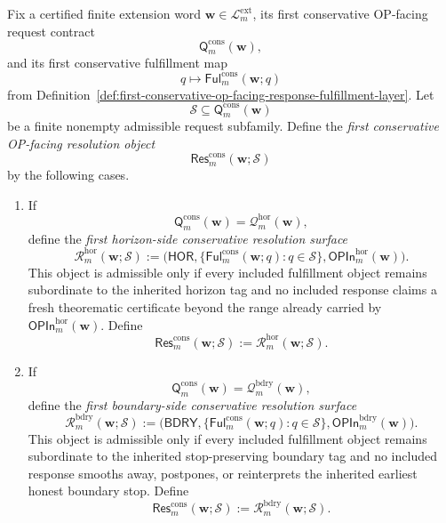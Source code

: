 \begin{definition}
\label{def:first-conservative-op-facing-response-aggregation-resolution-layer}
Fix a certified finite extension word \(\mathbf w\in\mathcal L^{\mathrm{ext}}_{m}\), its first conservative OP-facing request contract
\[
 \mathsf{Q}^{\mathrm{cons}}_{m}(\mathbf w),
\]
and its first conservative fulfillment map
\[
 q\mapsto \mathsf{Ful}^{\mathrm{cons}}_{m}(\mathbf w;q)
\]
from Definition~\ref{def:first-conservative-op-facing-response-fulfillment-layer}. Let
\[
 \mathcal S \subseteq \mathsf{Q}^{\mathrm{cons}}_{m}(\mathbf w)
\]
be a finite nonempty admissible request subfamily. Define the \emph{first conservative OP-facing resolution object}
\[
 \mathsf{Res}^{\mathrm{cons}}_{m}(\mathbf w;\mathcal S)
\]
by the following cases.
\begin{enumerate}[label=(\roman*)]
 \item If
 \[
 \mathsf{Q}^{\mathrm{cons}}_{m}(\mathbf w)=\mathcal Q^{\mathrm{hor}}_{m}(\mathbf w),
 \]
 define the \emph{first horizon-side conservative resolution surface}
 \[
 \mathcal R^{\mathrm{hor}}_{m}(\mathbf w;\mathcal S)
 :=
 \bigl(\mathsf{HOR},\{\mathsf{Ful}^{\mathrm{cons}}_{m}(\mathbf w;q):q\in\mathcal S\},\mathsf{OPIn}^{\mathrm{hor}}_{m}(\mathbf w)\bigr).
 \]
 This object is admissible only if every included fulfillment object remains subordinate to the inherited horizon tag and no included response claims a fresh theorematic certificate beyond the range already carried by \(\mathsf{OPIn}^{\mathrm{hor}}_{m}(\mathbf w)\). Define
 \[
 \mathsf{Res}^{\mathrm{cons}}_{m}(\mathbf w;\mathcal S)
 :=
 \mathcal R^{\mathrm{hor}}_{m}(\mathbf w;\mathcal S).
 \]
 \item If
 \[
 \mathsf{Q}^{\mathrm{cons}}_{m}(\mathbf w)=\mathcal Q^{\mathrm{bdry}}_{m}(\mathbf w),
 \]
 define the \emph{first boundary-side conservative resolution surface}
 \[
 \mathcal R^{\mathrm{bdry}}_{m}(\mathbf w;\mathcal S)
 :=
 \bigl(\mathsf{BDRY},\{\mathsf{Ful}^{\mathrm{cons}}_{m}(\mathbf w;q):q\in\mathcal S\},\mathsf{OPIn}^{\mathrm{bdry}}_{m}(\mathbf w)\bigr).
 \]
 This object is admissible only if every included fulfillment object remains subordinate to the inherited stop-preserving boundary tag and no included response smooths away, postpones, or reinterprets the inherited earliest honest boundary stop. Define
 \[
 \mathsf{Res}^{\mathrm{cons}}_{m}(\mathbf w;\mathcal S)
 :=
 \mathcal R^{\mathrm{bdry}}_{m}(\mathbf w;\mathcal S).
 \]
\end{enumerate}
\end{definition}

